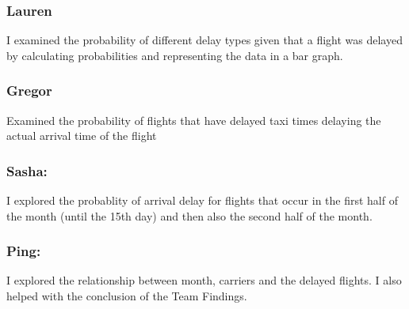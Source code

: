 \documentclass[]{article}
\begin{document}
\subsubsection{Lauren}\label{lauren-2}

I examined the probability of different delay types given that a flight
was delayed by calculating probabilities and representing the data in a
bar graph.

\subsubsection{Gregor}\label{gregor-1}

Examined the probability of flights that have delayed taxi times
delaying the actual arrival time of the flight

\subsubsection{Sasha:}\label{sasha-1}

I explored the probablity of arrival delay for flights that occur in the
first half of the month (until the 15th day) and then also the second
half of the month.

\subsubsection{Ping:}\label{ping-3}

I explored the relationship between month, carriers and the delayed
flights. I also helped with the conclusion of the Team Findings.
\end{document}
